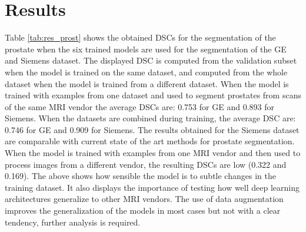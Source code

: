 \section{Results}

Table \ref{tab:res_prost} shows the obtained DSCs for the segmentation of the prostate when the six trained models are used for the segmentation of the GE and Siemens dataset.  The displayed DSC is computed from the validation subset when the model is trained on the same dataset, and computed from the whole dataset when the model is trained from a different dataset. 
When the model is trained with examples from one dataset and used to segment prostates from scans of the same MRI vendor the average DSCs are: 0.753 for GE and 0.893 for Siemens. When the datasets are combined during training, the average DSC are: 0.746 for GE and 0.909 for Siemens.  The results obtained for the Siemens dataset are comparable with current state of the art methods for prostate segmentation. When the model is trained with examples from one MRI vendor and then used to process images from a different vendor, the resulting DSCs are low (0.322 and 0.169).  %
The above shows how sensible the model is to subtle changes in the training dataset. It also displays the importance of testing how well deep learning architectures generalize to other MRI vendors.  The use of data augmentation improves the generalization of the models in most cases but not with a clear tendency, further analysis is required.

